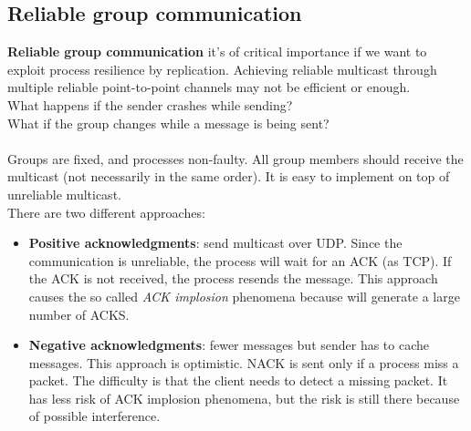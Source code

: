 \documentclass[10pt,a4paper]{article}
\begin{document}
\subsection{Reliable group communication}
\textbf{Reliable group communication} it's of critical importance if we want to exploit process resilience by replication. Achieving reliable multicast through multiple reliable point-to-point channels may not be efficient or enough. \\
What happens if the sender crashes while sending? \\
What if the group changes while a message is being sent? \\ \\
Groups are fixed, and processes non-faulty. All group members should receive the multicast (not necessarily in the same order). It is easy to implement on top of unreliable multicast. \\ There are two different approaches:
\begin{itemize}
	\item \textbf{Positive acknowledgments}: send multicast over UDP. Since the communication is unreliable, the process will wait for an ACK (as TCP). If the ACK is not received, the process resends the message. This approach causes the so called \textit{ACK implosion} phenomena because will generate a large number of ACKS.
	\item \textbf{Negative acknowledgments}: fewer messages but sender has to cache messages. This approach is optimistic. NACK is sent only if a process miss a packet. The difficulty is that the client needs to detect a missing packet. It has less risk of ACK implosion phenomena, but the risk is still there because of possible interference.
\end{itemize}
\end{document}
